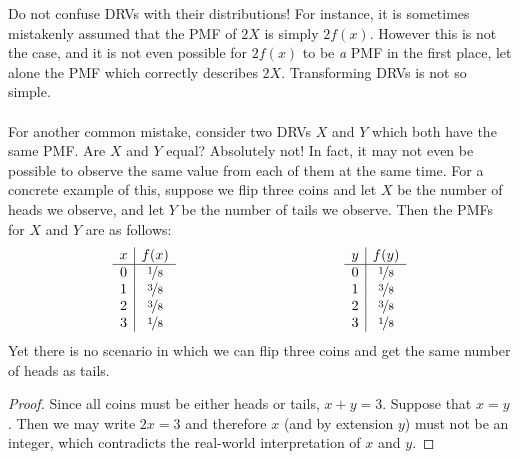 \documentclass{report}
\begin{document}
\begin{notsofast}
    Do not confuse DRVs with their distributions! For instance, it is sometimes mistakenly assumed that the PMF of $2X$ is simply $2f(x)$. However this is not the case, and it is not even possible for $2f(x)$ to be \emph a PMF in the first place, let alone the PMF which correctly describes $2X$. Transforming DRVs is not so simple.
    \\\\
    For another common mistake, consider two DRVs $X$ and $Y$ which both have the same PMF. Are $X$ and $Y$ equal? Absolutely not! In fact, it may not even be possible to observe the same value from each of them at the same time. For a concrete example of this, suppose we flip three coins and let $X$ be the number of heads we observe, and let $Y$ be the number of tails we observe. Then the PMFs for $X$ and $Y$ are as follows:
    \[
        \begin{array}{ccc}
            \begin{array}{c|c}
                x & f(x) \\
                \hline
                0 & \nicefrac 18 \\
                1 & \nicefrac 38 \\
                2 & \nicefrac 38 \\
                3 & \nicefrac 18
            \end{array}
            & \hspace{100px} &
            \begin{array}{c|c}
                y & f(y) \\
                \hline
                0 & \nicefrac 18 \\
                1 & \nicefrac 38 \\
                2 & \nicefrac 38 \\
                3 & \nicefrac 18
            \end{array}
        \end{array}
    \]
    Yet there is no scenario in which we can flip three coins and get the same number of heads as tails.
    \begin{proof}
        Since all coins must be either heads or tails, $x+y=3$. Suppose that $x=y$. Then we may write $2x=3$ and therefore $x$ (and by extension $y$) must not be an integer, which contradicts the real-world interpretation of $x$ and $y$.
    \end{proof}
\end{notsofast}
\end{document}
